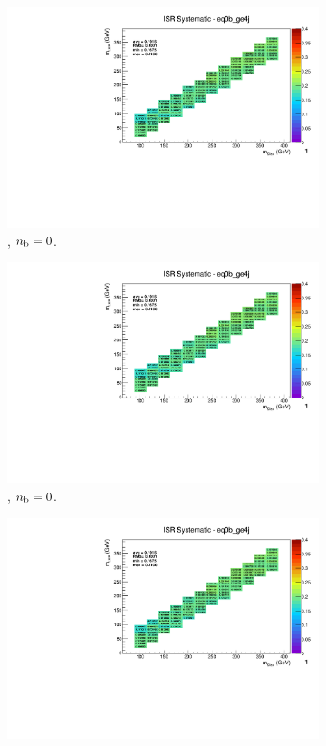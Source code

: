 \begin{figure}[ht!]
\begin{subfigure}[b]{0.32\textwidth}
    \includegraphics[width=\textwidth, page=14]{Figs/sms/t2degen/v19_3/systs/T2_4body_ISR_eq0b_ge4j.pdf}
    \caption{\njhigh, $n_{\text{b}} = 0$.}
  \end{subfigure}
  \begin{subfigure}[b]{0.32\textwidth}
    \includegraphics[width=\textwidth, page=9]{Figs/sms/t2degen/v19_3/systs/T2_4body_ISR_eq0b_ge4j.pdf}
    \caption{\njhigh, $n_{\text{b}} = 0$.}
  \end{subfigure}
  \begin{subfigure}[b]{0.32\textwidth}
    \includegraphics[width=\textwidth, page=1]{Figs/sms/t2degen/v19_3/systs/T2_4body_ISR_eq0b_ge4j.pdf}

\end{subfigure}
\end{figure}
